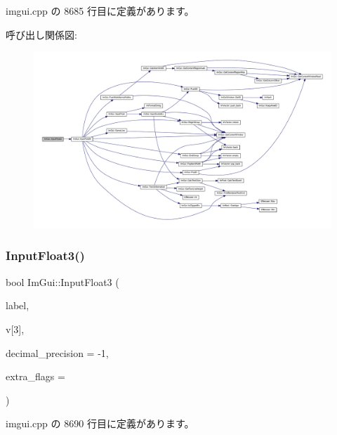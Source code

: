 imgui.\+cpp の 8685 行目に定義があります。

呼び出し関係図\+:\nopagebreak
\begin{figure}[H]
\begin{center}
\leavevmode
\includegraphics[width=350pt]{namespace_im_gui_a0c7aea6408696de9696f38a2f32419c4_cgraph}
\end{center}
\end{figure}
\mbox{\label{namespace_im_gui_a77e8d23f2e0477d11a7eb6b0aa773eb9}} 
\subsubsection{\texorpdfstring{Input\+Float3()}{InputFloat3()}}
{\footnotesize\ttfamily bool Im\+Gui\+::\+Input\+Float3 (\begin{DoxyParamCaption}\item[{const char $\ast$}]{label,  }\item[{float}]{v\mbox{[}3\mbox{]},  }\item[{int}]{decimal\+\_\+precision = {\ttfamily -\/1},  }\item[{\mbox{\hyperlink{imgui_8h_a7d2c6153a6b9b5d3178ce82434ac9fb8}{Im\+Gui\+Input\+Text\+Flags}}}]{extra\+\_\+flags = {} }\end{DoxyParamCaption})}



 imgui.\+cpp の 8690 行目に定義があります。

